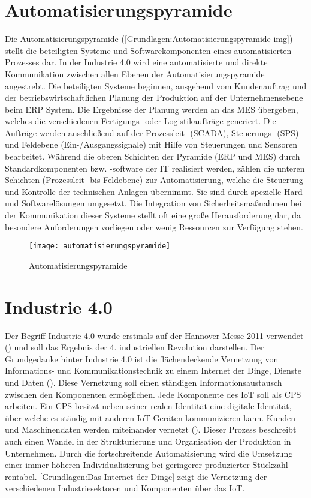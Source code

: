 \clearpage

\section{Automatisierungspyramide}
\label{Grundlagen:Automatisierungspyramide}
Die Automatisierungspyramide (\autoref{Grundlagen:Automatisierungspyramide-img}) stellt die beteiligten Systeme und Softwarekomponenten eines automatisierten Prozesses dar. In der Industrie 4.0 wird eine automatisierte und direkte Kommunikation zwischen allen Ebenen der Automatisierungspyramide angestrebt. Die beteiligten Systeme beginnen, ausgehend vom Kundenauftrag und der betriebswirtschaftlichen Planung der Produktion auf der Unternehmensebene beim \ac{ERP} System. Die Ergebnisse der Planung werden an das \ac{MES} übergeben, welches die verschiedenen Fertigungs- oder Logistikaufträge generiert. Die Aufträge werden anschließend auf der Prozessleit- (\ac{SCADA}), Steuerungs- (\ac{SPS}) und Feldebene (Ein-/Ausgangssignale) mit Hilfe von Steuerungen und Sensoren bearbeitet. Während die oberen Schichten der Pyramide (\ac{ERP} und \ac{MES}) durch Standardkomponenten bzw. -software der IT realisiert werden, zählen die unteren Schichten (Prozessleit- bis Feldebene) zur Automatisierung, welche die Steuerung und Kontrolle der technischen Anlagen übernimmt. Sie sind durch spezielle Hard- und Softwarelösungen umgesetzt. Die Integration von Sicherheitsmaßnahmen bei der Kommunikation dieser Systeme stellt oft eine große Herausforderung dar, da besondere Anforderungen vorliegen oder wenig Ressourcen zur Verfügung stehen.

\begin{figure}[h]
  \centering
  \texttt{[image: automatisierungspyramide]}
  \caption{Automatisierungspyramide}
  \label{Grundlagen:Automatisierungspyramide-img}
\end{figure}

\section{Industrie 4.0}
Der Begriff Industrie 4.0 wurde erstmals auf der Hannover Messe 2011 verwendet (\cite{drath2014}) und soll das Ergebnis der 4. industriellen Revolution darstellen. Der Grundgedanke hinter Industrie 4.0 ist die flächendeckende Vernetzung von Informations- und Kommunikationstechnik zu einem Internet der Dinge, Dienste und Daten (\cite{spath2013}). Diese Vernetzung soll einen ständigen Informationsaustausch zwischen den Komponenten ermöglichen. Jede Komponente des \ac{IoT} soll als \ac{CPS} arbeiten. Ein \ac{CPS} besitzt neben seiner realen Identität eine digitale Identität, über welche es ständig mit anderen \ac{IoT}-Geräten kommunizieren kann. Kunden- und Maschinendaten werden miteinander vernetzt (\cite{rami2016}). Dieser Prozess beschreibt auch einen Wandel in der Strukturierung und Organisation der Produktion in Unternehmen. Durch die fortschreitende Automatisierung wird die Umsetzung einer immer höheren Individualisierung bei geringerer produzierter Stückzahl rentabel. \autoref{Grundlagen:Das Internet der Dinge} zeigt die Vernetzung der verschiedenen Industriesektoren und Komponenten über das \ac{IoT}.

